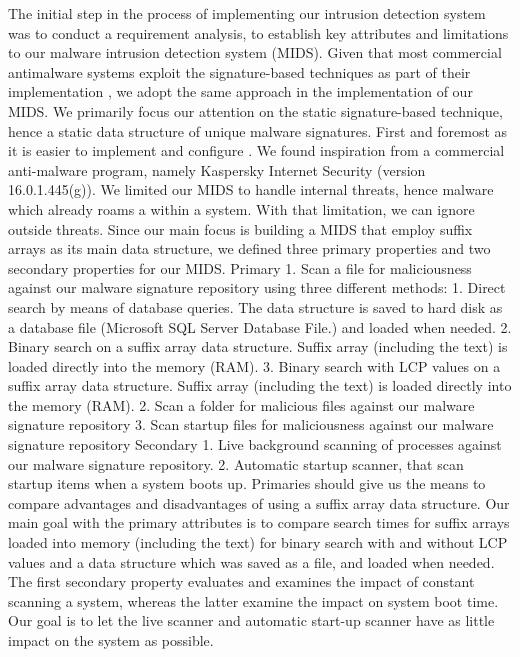 \documentclass[12pt]{article} %
\begin{document}
The initial step in the process of implementing our intrusion detection system was to conduct a requirement analysis, to establish key attributes and limitations to our malware intrusion detection system (MIDS). Given that most commercial antimalware systems exploit the signature-based techniques as part of their implementation \cite{kruegel2003using}, we adopt the same approach in the implementation of our MIDS. We primarily focus our attention on the static signature-based technique, hence a static data structure of unique malware signatures. First and foremost as it is easier to implement and configure \cite{kruegel2003using}.  
We found inspiration from a commercial anti-malware program, namely Kaspersky Internet Security (version 16.0.1.445(g)). We limited our MIDS to handle internal threats, hence malware which already roams a within a system. With that limitation, we can ignore outside threats. Since our main focus is building a MIDS that employ suffix arrays as its main data structure, we defined three primary properties and two secondary properties for our MIDS. 
Primary
1.    Scan a file for maliciousness against our malware signature repository using three different methods:
1.    Direct search by means of database queries. The data structure is saved to hard disk as a database file (Microsoft SQL Server Database File.) and loaded when needed.
2.    Binary search on a suffix array data structure. Suffix array (including the text) is loaded directly into the memory (RAM). 
3.    Binary search with LCP values on a suffix array data structure. Suffix array (including the text) is loaded directly into the memory (RAM). 
2.    Scan a folder for malicious files against our malware signature repository 
3.    Scan startup files for maliciousness against our malware signature repository
Secondary
1.    Live background scanning of processes against our malware signature repository.
2.    Automatic startup scanner, that scan startup items when a system boots up.  
Primaries should give us the means to compare advantages and disadvantages of using a suffix array data structure. Our main goal with the primary attributes is to compare search times for suffix arrays loaded into memory (including the text) for binary search with and without LCP values and a data structure which was saved as a file, and loaded when needed. The first secondary property evaluates and examines the impact of constant scanning a system, whereas the latter examine the impact on system boot time. Our goal is to let the live scanner and automatic start-up scanner have as little impact on the system as possible. 
\end{document}
